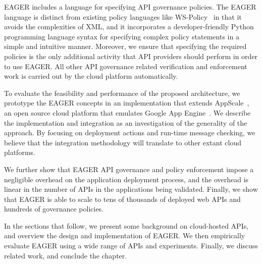 EAGER includes a language for specifying 
API governance policies.  The EAGER language is distinct from 
existing policy languages like WS-Policy~\cite{WSPolicy,soagovstandard}
in that it avoids the complexities of XML, 
and it incorporates a developer-friendly Python programming language syntax for 
specifying complex policy statements in a simple and 
intuitive manner. Moreover, we ensure that specifying the required policies 
is the only additional activity that API providers should perform in
order to use EAGER. All other API governance related verification and 
enforcement work is carried out by the cloud platform automatically.

To evaluate the feasibility and performance of the proposed 
architecture, we prototype the EAGER concepts in an implementation
that extends AppScale~\cite{appscale13}, 
an open source
cloud platform that emulates Google App Engine~\cite{gae}. We describe
the implementation and integration as an investigation of
the generality of the approach.  By focusing on deployment actions and
run-time message checking, we believe that the integration methodology
will translate to other extant cloud platforms.

We further show that 
EAGER API governance and policy enforcement impose a negligible 
overhead on the application deployment process, and the overhead
is linear in the number of APIs in the applications 
being validated.  
Finally, we show that EAGER is able to
scale to tens of thousands of deployed web APIs and hundreds of
governance policies.

In the sections that follow, we present some background on cloud-hosted APIs,
and overview the design and implementation of
EAGER. We then empirically evaluate EAGER using a wide range of APIs and
experiments.  Finally, we discuss related work, and conclude the chapter.
